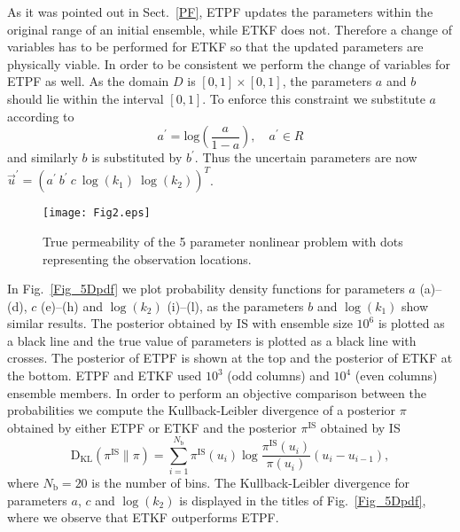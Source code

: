 \documentclass[12, a4paper]{article}
\numberwithin{equation}{section}
\begin{document}
As it was pointed out in Sect.~\ref{PF}, ETPF updates the parameters within the original range of an initial ensemble, while ETKF does not. Therefore a change of variables has to be performed for ETKF so that the updated parameters are physically viable. In order to be consistent we perform the change of variables for ETPF as well. As the domain $D$ is $[0,1] \times [0,1]$, the parameters $a$ and $b$ should lie within the interval $[0,1]$. To enforce this constraint we substitute $a$ according to
\begin{equation*}
a^\prime =\text{log}\left(\frac{a}{1-a}\right), \quad a^\prime \in R
\end{equation*}
and similarly $b$ is substituted by $b^\prime$. Thus the uncertain parameters are now $\vec{u}^\prime = (a^\prime\  b^\prime\  c\ \log(k_1)\ \log(k_2))^T$. 

\begin{figure} [t]
	\centering			
	\texttt{[image: Fig2.eps]}
	\caption{True permeability of the 5 parameter nonlinear problem with dots representing the observation locations.}\label{Fig_truth2L}
\end{figure}

In Fig.~\ref{Fig_5Dpdf} we plot probability density functions for parameters $a$ (a)--(d), $c$ (e)--(h) and $\log(k_2)$ (i)--(l), 
as the parameters $b$ and $\log(k_1)$ show similar results. 
The posterior obtained by IS with ensemble size $10^6$ is plotted as a black line and the true value of parameters is plotted as a black line with crosses. 
The posterior of ETPF is shown at the top and the posterior of ETKF at the bottom. 
ETPF and ETKF used $10^3$ (odd columns) and $10^4$ (even columns) ensemble members. 
In order to perform an objective comparison between the probabilities we compute the Kullback-Leibler divergence of a 
posterior $\pi$ obtained by either ETPF or ETKF and the posterior $\pi^\textrm{IS}$ obtained by IS
\begin{equation}\label{DKL}
\textrm{D}_\textrm{KL} (\pi^\textrm{IS} \parallel \pi) = \sum_{i=1}^{N_\textrm{b}} \pi^\textrm{IS}(u_i) \log \frac{\pi^\textrm{IS}(u_i)}{\pi(u_i)}(u_i-u_{i-1}), 
\end{equation}
where $N_\textrm{b}=20$ is the number of bins. The Kullback-Leibler divergence for parameters $a$, $c$ and $\log(k_2)$
is displayed in the titles of Fig.~\ref{Fig_5Dpdf}, where we observe that ETKF outperforms ETPF.
\end{document}
